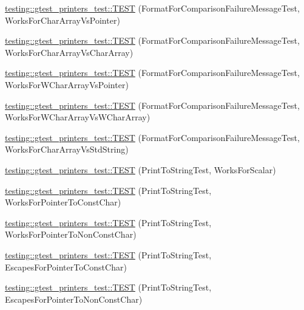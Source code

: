 \begin{DoxyCompactItemize}
\item 
\mbox{\hyperlink{namespacetesting_1_1gtest__printers__test_ac25834e0463cf9f3d231db24e7b220e5}{testing\+::gtest\+\_\+printers\+\_\+test\+::\+T\+E\+ST}} (Format\+For\+Comparison\+Failure\+Message\+Test, Works\+For\+Char\+Array\+Vs\+Pointer)
\item 
\mbox{\hyperlink{namespacetesting_1_1gtest__printers__test_aba32640344f0186de5fbb6bb47e0c5a5}{testing\+::gtest\+\_\+printers\+\_\+test\+::\+T\+E\+ST}} (Format\+For\+Comparison\+Failure\+Message\+Test, Works\+For\+Char\+Array\+Vs\+Char\+Array)
\item 
\mbox{\hyperlink{namespacetesting_1_1gtest__printers__test_a1e95289500400eff5fdcd45c5864a6d2}{testing\+::gtest\+\_\+printers\+\_\+test\+::\+T\+E\+ST}} (Format\+For\+Comparison\+Failure\+Message\+Test, Works\+For\+W\+Char\+Array\+Vs\+Pointer)
\item 
\mbox{\hyperlink{namespacetesting_1_1gtest__printers__test_af4b502fb5745d2ee0bfb81d1c8eb95f6}{testing\+::gtest\+\_\+printers\+\_\+test\+::\+T\+E\+ST}} (Format\+For\+Comparison\+Failure\+Message\+Test, Works\+For\+W\+Char\+Array\+Vs\+W\+Char\+Array)
\item 
\mbox{\hyperlink{namespacetesting_1_1gtest__printers__test_ac2300073f401f783ff7b1ef97d2cbd6d}{testing\+::gtest\+\_\+printers\+\_\+test\+::\+T\+E\+ST}} (Format\+For\+Comparison\+Failure\+Message\+Test, Works\+For\+Char\+Array\+Vs\+Std\+String)
\item 
\mbox{\hyperlink{namespacetesting_1_1gtest__printers__test_a5d1bc4b12c18ccaec2ced9f45c092567}{testing\+::gtest\+\_\+printers\+\_\+test\+::\+T\+E\+ST}} (Print\+To\+String\+Test, Works\+For\+Scalar)
\item 
\mbox{\hyperlink{namespacetesting_1_1gtest__printers__test_a68100148758516ebab9c761ca7778586}{testing\+::gtest\+\_\+printers\+\_\+test\+::\+T\+E\+ST}} (Print\+To\+String\+Test, Works\+For\+Pointer\+To\+Const\+Char)
\item 
\mbox{\hyperlink{namespacetesting_1_1gtest__printers__test_a1db34d8760c17157572ce2877007d15a}{testing\+::gtest\+\_\+printers\+\_\+test\+::\+T\+E\+ST}} (Print\+To\+String\+Test, Works\+For\+Pointer\+To\+Non\+Const\+Char)
\item 
\mbox{\hyperlink{namespacetesting_1_1gtest__printers__test_ab8fce4287e837cfcd851ded56b62f9ce}{testing\+::gtest\+\_\+printers\+\_\+test\+::\+T\+E\+ST}} (Print\+To\+String\+Test, Escapes\+For\+Pointer\+To\+Const\+Char)
\item 
\mbox{\hyperlink{namespacetesting_1_1gtest__printers__test_a7203081ef422f0835643d2c54b8ebf28}{testing\+::gtest\+\_\+printers\+\_\+test\+::\+T\+E\+ST}} (Print\+To\+String\+Test, Escapes\+For\+Pointer\+To\+Non\+Const\+Char)

\end{DoxyCompactItemize}
